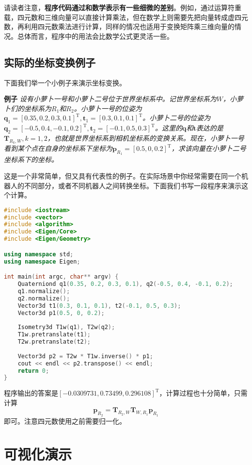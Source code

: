 请读者注意，\textbf{程序代码通过和数学表示有一些细微的差别}。例如，通过运算符重载，四元数和三维向量可以直接计算乘法，但在数学上则需要先把向量转成虚四元数，再利用四元数乘法进行计算，同样的情况也适用于变换矩阵乘三维向量的情况。总体而言，程序中的用法会比数学公式更灵活一些。

\subsection{实际的坐标变换例子}
下面我们举一个小例子来演示坐标变换。

\noindent \textbf{例子} \quad \emph{设有小萝卜一号和小萝卜二号位于世界坐标系中。记世界坐标系为$W$，小萝卜们的坐标系为$R_1$和$R_2$。小萝卜一号的位姿为$\bm{q}_1 = [ 0.35, 0.2, 0.3, 0.1 ]^\mathrm{T}, \bm{t}_1 = [0.3, 0.1, 0.1]^\mathrm{T}$。小萝卜二号的位姿为$\bm{q}_2 = [ -0.5, 0.4, -0.1, 0.2 ]^\mathrm{T}, \bm{t}_2 = [-0.1, 0.5, 0.3]^\mathrm{T}$。这里的$\bm{q}$和$\bm{t}$表达的是$\bm{T}_{R_k, W},k=1,2$，也就是世界坐标系到相机坐标系的变换关系。现在，小萝卜一号看到某个点在自身的坐标系下坐标为$\bm{p}_{R_1} = [0.5,0,0.2]^\mathrm{T}$，求该向量在小萝卜二号坐标系下的坐标。}

这是一个非常简单，但又具有代表性的例子。在实际场景中你经常需要在同一个机器人的不同部分，或者不同机器人之间转换坐标。下面我们书写一段程序来演示这个计算。

\begin{lstlisting}[language=c++,caption=slambook2/ch3/examples/coordinateTransform.cpp]
#include <iostream>
#include <vector>
#include <algorithm>
#include <Eigen/Core>
#include <Eigen/Geometry>

using namespace std;
using namespace Eigen;

int main(int argc, char** argv) {
    Quaterniond q1(0.35, 0.2, 0.3, 0.1), q2(-0.5, 0.4, -0.1, 0.2);
    q1.normalize();
    q2.normalize();
    Vector3d t1(0.3, 0.1, 0.1), t2(-0.1, 0.5, 0.3);
    Vector3d p1(0.5, 0, 0.2);
    
    Isometry3d T1w(q1), T2w(q2);
    T1w.pretranslate(t1);
    T2w.pretranslate(t2);
    
    Vector3d p2 = T2w * T1w.inverse() * p1;
    cout << endl << p2.transpose() << endl;
    return 0;
}
\end{lstlisting}

程序输出的答案是$[-0.0309731,0.73499,0.296108]^\mathrm{T}$，计算过程也十分简单，只需计算$$\bm{p}_{R_2} = \bm{T}_{R_2,W}\bm{T}_{W, R_1} \bm{p}_{R_1}$$即可。注意四元数使用之前需要归一化。

\section{可视化演示}
